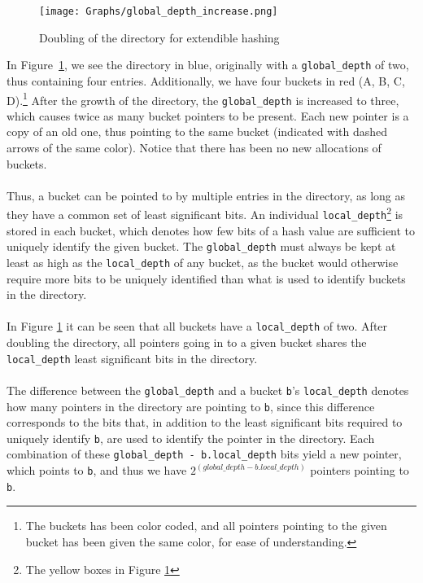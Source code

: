 \documentclass[11pt]{report} %
\begin{document}
\begin{figure}[H]
  \centering
  \texttt{[image: Graphs/global\_depth\_increase.png]}
  \caption{Doubling of the directory for extendible hashing}
  \label{fig:global_depth_increase}
\end{figure}
\noindent
In Figure~\ref{fig:global_depth_increase}, we see the directory in blue, originally with a \verb|global_depth| of two, thus containing four entries. Additionally, we have four buckets in red (A, B, C, D).\footnote{The buckets has been color coded, and all pointers pointing to the given bucket has been given the same color, for ease of understanding.} After the growth of the directory, the \verb|global_depth| is increased to three, which causes twice as many bucket pointers to be present. Each new pointer is a copy of an old one, thus pointing to the same bucket (indicated with dashed arrows of the same color). Notice that there has been no new allocations of buckets.\\
\\
Thus, a bucket can be pointed to by multiple entries in the directory, as long as they have a common set of least significant bits. An individual \verb|local_depth|\footnote{The yellow boxes in Figure \ref{fig:global_depth_increase}} is stored in each bucket, which denotes how few bits of a hash value are sufficient to uniquely identify the given bucket. The \verb|global_depth| must always be kept at least as high as the \verb|local_depth| of any bucket, as the bucket would otherwise require more bits to be uniquely identified than what is used to identify buckets in the directory. \\
\\
In Figure \ref{fig:global_depth_increase} it can be seen that all buckets have a \verb|local_depth| of two. After doubling the directory, all pointers going in to a given bucket shares the \verb|local_depth| least significant bits in the directory. \\
\\
The difference between the \verb|global_depth| and a bucket \verb|b|'s \verb|local_depth| denotes how many pointers in the directory are pointing to \verb|b|, since this difference corresponds to the bits that, in addition to the least significant bits required to uniquely identify \verb|b|, are used to identify the pointer in the directory. Each combination of these \verb|global_depth - b.local_depth| bits yield a new pointer, which points to \verb|b|, and thus we have $2^{(global\_depth-b.local\_depth)}$ pointers pointing to \verb|b|. \\
\end{document}
